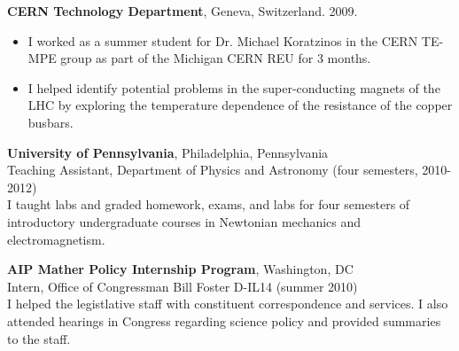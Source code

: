 \documentclass{resume2}
\begin{document}
\begin{resume}
\sectionX{}

\textbf{CERN Technology Department}, Geneva, Switzerland. 2009.
\begin{itemize}
\item I worked as a summer student for Dr. Michael Koratzinos in the CERN TE-MPE group as part of the Michigan CERN REU for 3 months.
\item I helped identify potential problems in the super-conducting magnets of the LHC by exploring the temperature dependence of the resistance of the copper busbars.
\end{itemize}

\vspace{0.2cm}

\textbf{University of Pennsylvania}, Philadelphia, Pennsylvania \\
Teaching Assistant, Department of Physics and Astronomy (four semesters, 2010-2012) \\
I taught labs and graded homework, exams, and labs for four semesters of introductory undergraduate courses in Newtonian mechanics and electromagnetism.

\sectionX{}

\textbf{AIP Mather Policy Internship Program}, Washington, DC \\
Intern, Office of Congressman Bill Foster D-IL14 (summer 2010) \\
I helped the legistlative staff with constituent correspondence and services. I also attended hearings in Congress regarding science policy and provided summaries to the staff.


\end{resume}
\end{document}
